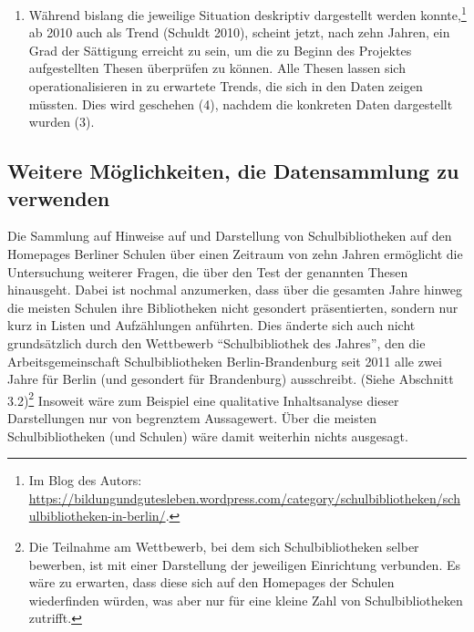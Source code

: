\documentclass[a4paper,
fontsize=11pt,
oneside,
numbers=noperiodatend,
parskip=half-,
bibliography=totoc,
final
]{scrartcl}
\begin{document}
\begin{enumerate}
  dies taten, eingetragen. So wurden Kontinuitäten und Diskontinuitäten
  sichtbar. Allerdings galt, wie schon erwähnt, zu beachten, dass auch
  die Berliner Schullandschaft selber kontinuierlich in Bewegung ist,
  insbesondere -- durch die Schulstrukturreformen -- in den Jahren 2010
  und 2011. Eine Schulbibliothek kann auch deshalb geschlossen werden,
  weil die jeweilige Schule mit einer anderen vereinigt wird, was wenig
  über die mögliche Kontinuität der Bibliothek selber aussagt; Schulen
  können umbenannt werden, was den Eindruck vermitteln kann, dass eine
  Schulbibliothek geschlossen und eine andere eröffnet wurde, obwohl es
  sich um die gleiche Einrichtung handelt. Es wurde versucht, auf diese
  potentiellen Fehlerquellen zu achten.\footnote{Zur Definition von
    \enquote{kontinuierlich arbeitender Schulbibliothek} siehe Abschnitt
    4, Diskussion der These 5.}
\item
  Während bislang die jeweilige Situation deskriptiv dargestellt werden
  konnte,\footnote{Im Blog des Autors:
    \url{https://bildungundgutesleben.wordpress.com/category/schulbibliotheken/schulbibliotheken-in-berlin/}.}
  ab 2010 auch als Trend (Schuldt 2010), scheint jetzt, nach zehn
  Jahren, ein Grad der Sättigung erreicht zu sein, um die zu Beginn des
  Projektes aufgestellten Thesen überprüfen zu können. Alle Thesen
  lassen sich operationalisieren in zu erwartete Trends, die sich in den
  Daten zeigen müssten. Dies wird geschehen (4), nachdem die konkreten
  Daten dargestellt wurden (3).
\end{enumerate}

\subsection{Weitere Möglichkeiten, die Datensammlung zu
verwenden}\label{weitere-muxf6glichkeiten-die-datensammlung-zu-verwenden}

Die Sammlung auf Hinweise auf und Darstellung von Schulbibliotheken auf
den Homepages Berliner Schulen über einen Zeitraum von zehn Jahren
ermöglicht die Untersuchung weiterer Fragen, die über den Test der
genannten Thesen hinausgeht. Dabei ist nochmal anzumerken, dass über die
gesamten Jahre hinweg die meisten Schulen ihre Bibliotheken nicht
gesondert präsentierten, sondern nur kurz in Listen und Aufzählungen
anführten. Dies änderte sich auch nicht grundsätzlich durch den
Wettbewerb \enquote{Schulbibliothek des Jahres}, den die
Arbeitsgemeinschaft Schulbibliotheken Berlin-Brandenburg seit 2011 alle
zwei Jahre für Berlin (und gesondert für Brandenburg) ausschreibt.
(Siehe Abschnitt 3.2)\footnote{Die Teilnahme am Wettbewerb, bei dem sich
  Schulbibliotheken selber bewerben, ist mit einer Darstellung der
  jeweiligen Einrichtung verbunden. Es wäre zu erwarten, dass diese sich
  auf den Homepages der Schulen wiederfinden würden, was aber nur für
  eine kleine Zahl von Schulbibliotheken zutrifft.} Insoweit wäre zum
Beispiel eine qualitative Inhaltsanalyse dieser Darstellungen nur von
begrenztem Aussagewert. Über die meisten Schulbibliotheken (und Schulen)
wäre damit weiterhin nichts ausgesagt.
\end{document}
